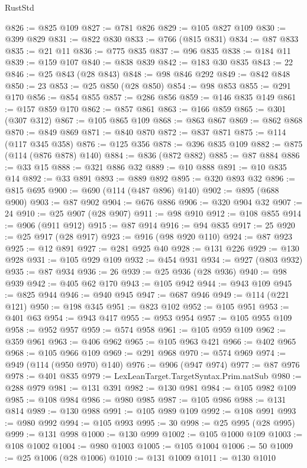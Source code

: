 \begin{lexlean}{RustStd}
\begin{coremodule}
{\begin{coremodule}
{{{{{{{{{{{{{{{{{{{{{{{{{{{{{{{{{{@826 := @825 @109
@827 := @781 @826
@829 := @105 @827 @109
@830 := @399 @829
@831 := @822 @830
@833 := @766 (@815 @831)
@834 := @87 @833
@835 := @21 @11
@836 := @775 @835
@837 := @96 @835
@838 := @184 @11
@839 := @159 @107
@840 := @838 @839
@842 := @183 @30 @835
@843 := 22
@846 := @25 @843 (@28 @843)
@848 := @98 @846 @292
@849 := @842 @848
@850 := 23
@853 := @25 @850 (@28 @850)
@854 := @98 @853
@855 := @291 @170
@856 := @854 @855
@857 := @286 @856
@859 := @146 @835 @149
@861 := @157 @859 @170
@862 := @857 @861
@863 := @166 @859
@865 := @301 (@307 @312)
@867 := @105 @865 @109
@868 := @863 @867
@869 := @862 @868
@870 := @849 @869
@871 := @840 @870
@872 := @837 @871
@875 := @114 (@117 @345 @358)
@876 := @125 @356
@878 := @396 @835 @109
@882 := @875 (@114 (@876 @878) @140)
@884 := @836 (@872 @882)
@885 := @87 @884
@886 := @33 @15
@888 := @321 @886 @32
@889 := @10 @888
@891 := @10 @835 @14
@892 := @33 @891
@893 := @889 @892
@895 := @320 @893 @32
@896 := @815 @695
@900 := @690 (@114 (@487 @896) @140)
@902 := @895 (@688 @900)
@903 := @87 @902
@904 := @676 @886
@906 := @320 @904 @32
@907 := 24
@910 := @25 @907 (@28 @907)
@911 := @98 @910
@912 := @108 @855
@914 := @906 (@911 @912)
@915 := @87 @914
@916 := @94 @835
@917 := 25
@920 := @25 @917 (@28 @917)
@923 := @916 (@98 @920 @110)
@924 := @87 @923
@925 := @12 @891
@927 := @281 @925 @40
@928 := @131 @226
@929 := @130 @928
@931 := @105 @929 @109
@932 := @454 @931
@934 := @927 (@803 @932)
@935 := @87 @934
@936 := 26
@939 := @25 @936 (@28 @936)
@940 := @98 @939
@942 := @405 @62 @170
@943 := @105 @942
@944 := @943 @109
@945 := @825 @944
@946 := @940 @945
@947 := @687 @946
@949 := @114 (@221 @121)
@950 := @198 @345
@951 := @823 @102
@952 := @105 @951
@953 := @401 @63
@954 := @943 @417
@955 := @953 @954
@957 := @105 @955 @109
@958 := @952 @957
@959 := @574 @958
@961 := @105 @959 @109
@962 := @359 @961
@963 := @406 @962
@965 := @105 @963 @421
@966 := @402 @965
@968 := @105 @966 @109
@969 := @291 @968
@970 := @574 @969
@974 := @949 (@114 (@950 @970) @140)
@976 := @906 (@947 @974)
@977 := @87 @976
@978 := @401 @835
@979 := LexLeanTarget.TargetSyntax.Prim.natSub
@980 := @288 @979
@981 := @131 @391
@982 := @130 @981
@984 := @105 @982 @109
@985 := @108 @984
@986 := @980 @985
@987 := @105 @986
@988 := @131 @814
@989 := @130 @988
@991 := @105 @989 @109
@992 := @108 @991
@993 := @980 @992
@994 := @105 @993
@995 := 30
@998 := @25 @995 (@28 @995)
@999 := @131 @998
@1000 := @130 @999
@1002 := @105 @1000 @109
@1003 := @108 @1002
@1004 := @980 @1003
@1005 := @105 @1004
@1006 := 50
@1009 := @25 @1006 (@28 @1006)
@1010 := @131 @1009
@1011 := @130 @1010
}}}}}}}}}}}}}}}}}}}}}}}}}}}}}}}}}}
\end{coremodule}}
\end{coremodule}
\end{lexlean}
